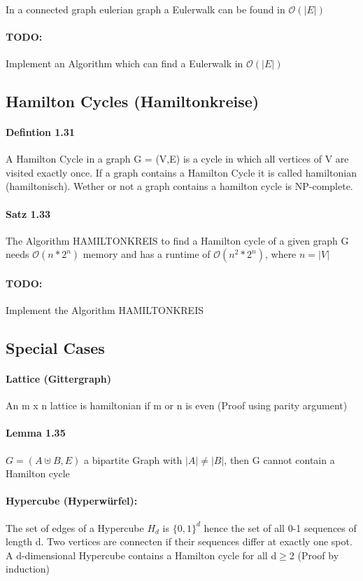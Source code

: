 \documentclass[8pt]{extreport}
\begin{document}
\paragraph{} In a connected graph eulerian graph a Eulerwalk can be found in $\mathcal{O}(|E|)$
\paragraph{TODO:} Implement an Algorithm which can find a Eulerwalk in $ \mathcal{O}(|E|)$
\subsection{Hamilton Cycles (Hamiltonkreise)}
\paragraph{Defintion 1.31} A Hamilton Cycle in a graph G = (V,E) is a cycle in which all vertices of V are visited exactly once. If a graph contains a Hamilton Cycle it is called hamiltonian (hamiltonisch). Wether or not a graph contains a hamilton cycle is NP-complete.
\paragraph{Satz 1.33} The Algorithm HAMILTONKREIS to find a Hamilton cycle of a given graph G needs $\mathcal{O}(n*2^{n})$ memory and  has a runtime of $\mathcal{O}(n^{2}*2^{n})$, where $n=|V|$
\paragraph{TODO:} Implement the Algorithm HAMILTONKREIS
\subsection{Special Cases}
\paragraph{Lattice (Gittergraph)} An m x n lattice is hamiltonian if m or n is even (Proof using parity argument)
\paragraph{Lemma 1.35} $G =(A \uplus B, E)$ a bipartite Graph with $|A| \neq |B|$, then G cannot contain a Hamilton cycle
\paragraph{Hypercube (Hyperwürfel):} The set of edges of a Hypercube $H_{d}$ is $\{0,1\}^{d}$ hence the set of all 0-1 sequences of length d. Two vertices are connecten if their sequences differ at exactly one spot. A d-dimensional Hypercube contains a Hamilton cycle for all d$\geq$2 (Proof by induction)
\end{document}
